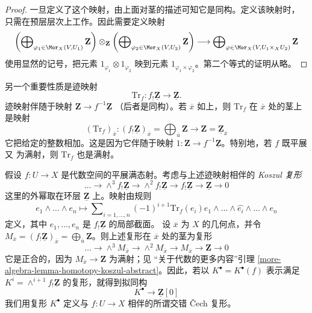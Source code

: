 \begin{proof}
一旦定义了这个映射，由上面对茎的描述可知它是同构。定义该映射时，
只需在预层层次上工作。因此需要定义映射
$$
\left(\bigoplus\nolimits_{\varphi_1 \in \Mor_X(V, U_1)} \mathbf{Z}\right)
\otimes_{\mathbf{Z}}
\left(\bigoplus\nolimits_{\varphi_2 \in \Mor_X(V, U_2)} \mathbf{Z}\right)
\longrightarrow
\bigoplus\nolimits_{\varphi \in \Mor_X(V, U_1 \times_X U_2)}
\mathbf{Z}
$$
使用显然的记号，把元素 $1_{\varphi_1} \otimes 1_{\varphi_2}$ 映到元素
$1_{\varphi_1 \times \varphi_2}$。第二个等式的证明从略。
\end{proof}

\noindent
另一个重要性质是迹映射
$$
\text{Tr}_f : f_!\underline{\mathbf{Z}} \longrightarrow \underline{\mathbf{Z}}.
$$
迹映射伴随于映射 $\mathbf{Z} \to f^{-1}\underline{\mathbf{Z}}$
（后者是同构）。若 $\overline{x}$ 如上，则 $\text{Tr}_f$ 在
$\overline{x}$ 处的茎上是映射
$$
(\text{Tr}_f)_{\overline{x}} :
(f_!\underline{\mathbf{Z}})_{\overline{x}} =
\bigoplus\nolimits_{\overline{u}} \mathbf{Z}
\longrightarrow
\mathbf{Z} = \underline{\mathbf{Z}}_{\overline{x}}
$$
它把给定的整数相加。这是因为它伴随于映射
$1 : \mathbf{Z} \to f^{-1}\underline{\mathbf{Z}}$。特别地，若 $f$ 既平展又
为满射，则 $\text{Tr}_f$ 也是满射。

\medskip\noindent
假设 $f : U \to X$ 是代数空间的平展满态射。考虑与上述迹映射相伴的
{\it Koszul 复形}
$$
\ldots \to \wedge^3f_!\underline{\mathbf{Z}} \to
\wedge^2f_!\underline{\mathbf{Z}} \to f_!\underline{\mathbf{Z}} \to
\underline{\mathbf{Z}} \to 0
$$
这里的外幂取在环层 $\underline{\mathbf{Z}}$ 上。映射由规则
$$
e_1 \wedge \ldots \wedge e_n \longmapsto
\sum\nolimits_{i = 1, \ldots, n} (-1)^{i + 1}
\text{Tr}_f(e_i)
e_1 \wedge \ldots \wedge \widehat{e_i} \wedge \ldots \wedge e_n
$$
定义，其中 $e_1, \ldots, e_n$ 是 $f_!\underline{\mathbf{Z}}$ 的局部截面。
设 $\overline{x}$ 为 $X$ 的几何点，并令
$M_{\overline{x}} = (f_!\underline{\mathbf{Z}})_{\overline{x}} =
\bigoplus_{\overline{u}} \mathbf{Z}$。则上述复形在 $\overline{x}$ 处的茎为复形
$$
\ldots \to \wedge^3 M_{\overline{x}} \to \wedge^2 M_{\overline{x}}
\to M_{\overline{x}} \to \mathbf{Z} \to 0
$$
它是正合的，因为 $M_{\overline{x}} \to \mathbf{Z}$ 为满射；见
“关于代数的更多内容”引理
\ref{more-algebra-lemma-homotopy-koszul-abstract}。因此，若以
$K^\bullet = K^\bullet(f)$ 表示满足
$K^i = \wedge^{i + 1}f_!\underline{\mathbf{Z}}$ 的复形，就得到拟同构
\begin{equation}
\label{equation-quasi-isomorphism}
K^\bullet \longrightarrow \underline{\mathbf{Z}}[0]
\end{equation}
我们用复形 $K^\bullet$ 定义与 $f : U \to X$ 相伴的所谓交错 {\v C}ech 复形。

